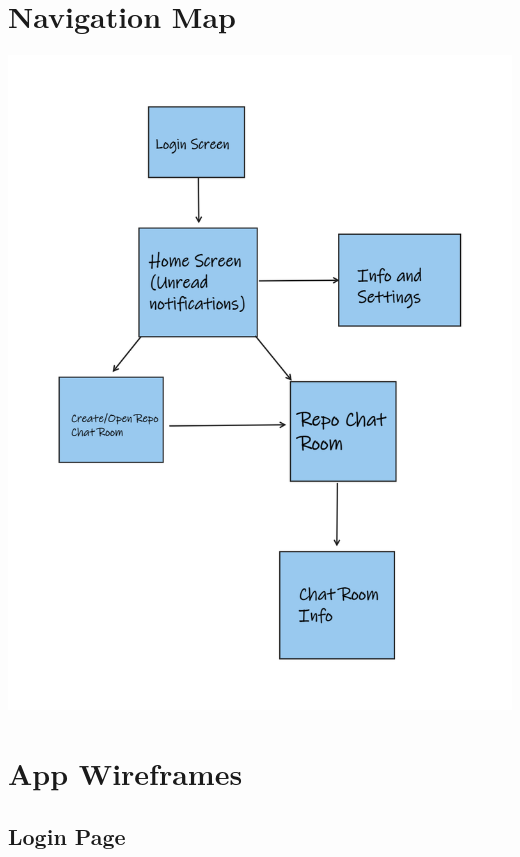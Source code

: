 \documentclass{report}
\begin{document}
\section{Navigation Map}
\begin{center}
    \includegraphics[width=\textwidth]{nav-graph}
\end{center}


\section{App Wireframes}

\subsection{Login Page}
\end{document}
